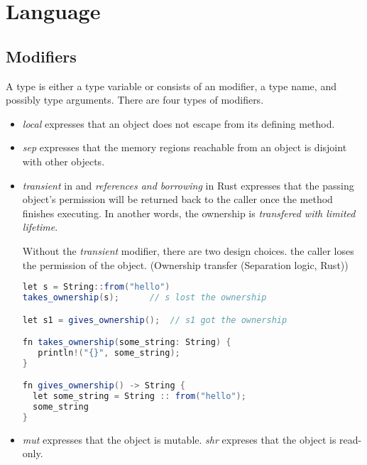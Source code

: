 \section{Language}
\label{sec:language}

\subsection{Modifiers}
A type is either a type variable or consists of an modifier, a type name, and possibly type arguments. There are four types of modifiers.
\begin{itemize}
\item \emph{local} expresses that an object does not escape from its defining method.
\item \emph{sep} expresses that the memory regions reachable from an object is disjoint with other objects.
\item \emph{transient} in \cite{haller2010capabilities} and \emph{references and borrowing} in Rust expresses that the passing object's permission will be returned back to the caller once the method finishes executing. In another words, the ownership is \emph{transfered with limited lifetime}.

Without the \emph{transient} modifier, there are two design choices. 
the caller loses the permission of the object. (Ownership transfer (Separation logic, Rust))
\begin{lstlisting}[language=Scala,basicstyle=\footnotesize\ttfamily]
let s = String::from("hello")
takes_ownership(s);      // s lost the ownership

let s1 = gives_ownership();  // s1 got the ownership

fn takes_ownership(some_string: String) {
   println!("{}", some_string);
}

fn gives_ownership() -> String {
  let some_string = String :: from("hello");
  some_string
}
\end{lstlisting}

\item \emph{mut} expresses that the object is mutable. \emph{shr} expreses that the object is read-only.
\end{itemize}

